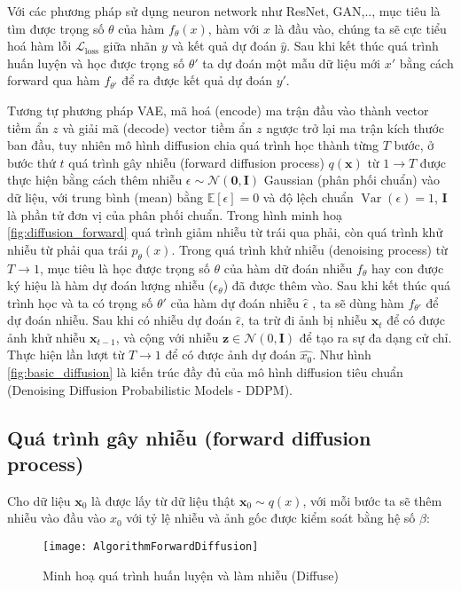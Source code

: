 Với các phương pháp sử dụng neuron network như ResNet, GAN,.., mục tiêu là tìm được trọng số $\theta$ của hàm $f_{\theta}(x)$, hàm với $x$ là đầu vào, chúng ta sẽ cực tiểu hoá hàm lỗi $\mathcal{L}_\text{loss}$ giữa nhãn $y$ và kết quả dự đoán $\hat{y}$. Sau khi kết thúc quá trình huấn luyện và học được trọng số $\theta'$ ta dự đoán một mẫu dữ liệu mới $x'$ bằng cách forward qua hàm $f_{\theta'}$ để ra được kết quả dự đoán $y'$.



Tương tự phương pháp VAE, mã hoá (encode) ma trận đầu vào thành vector tiềm ẩn $z$ và giải mã (decode) vector tiềm ẩn $z$ ngược trở lại ma trận kích thước ban đầu, tuy nhiên mô hình diffusion chia quá trình học thành từng $T$ bước, ở bước thứ $t$ quá trình gây nhiễu (forward diffusion process) $q(\mathbf{x})$ từ $1 \to T$ được thực hiện bằng cách thêm nhiễu $\epsilon \sim \mathcal{N} (\mathbf{0}, \mathbf{I})$ Gaussian (phân phối chuẩn) vào dữ liệu, với trung bình  (mean) bằng $\mathbb{E}[\epsilon]=0$ và độ lệch chuẩn $\operatorname{Var}(\epsilon)=1$, $\mathbf{I}$ là phần tử đơn vị của phân phối chuẩn. Trong hình minh hoạ \ref{fig:diffusion_forward} quá trình giảm nhiễu từ trái qua phải, còn quá trình khử nhiễu từ phải qua trái $p_\theta(x)$. Trong quá trình khử nhiễu (denoising process) từ $T \to 1$, mục tiêu là học được trọng số $\theta$ của hàm dữ đoán nhiễu $f_{\theta}$ hay con được ký hiệu là hàm dự đoán lượng nhiễu ($\epsilon_\theta$) đã được thêm vào. Sau khi kết thúc quá trình học và ta có trọng số $\theta'$ của hàm dự đoán nhiễu $\hat{\epsilon}$ , ta sẽ dùng hàm $f_{\theta'}$ để dự đoán nhiễu. Sau khi có nhiễu dự đoán $\hat{\epsilon}$, ta trừ đi ảnh bị nhiễu $\mathbf{x}_{t}$ để có được ảnh khử nhiễu $\mathbf{x}_{t-1}$, và cộng với nhiễu $ \mathbf{z} \in \mathcal{N}(0, \mathbf{I})$ để tạo ra sự đa dạng cử chỉ. Thực hiện lần lượt từ $T \to 1$ để có được ảnh dự đoán $\hat{x_0}$. Như hình \ref{fig:basic_diffusion} là kiến trúc đầy đủ của mô hình diffusion tiêu chuẩn (Denoising Diffusion Probabilistic Models - DDPM).

\subsection{Quá trình gây nhiễu (forward diffusion process)}

Cho dữ liệu $\mathbf{x}_{0}$ là được lấy từ dữ liệu thật $\mathbf{x}_{0} \sim q(x)$, với mỗi bước ta sẽ thêm nhiễu vào đầu vào $x_{0}$ với tỷ lệ nhiễu và ảnh gốc được kiểm soát bằng hệ số $\beta$:
\vspace{-20pt}
\setcounter{figure}{5}
\begin{figure*}
	\centering
	\texttt{[image: AlgorithmForwardDiffusion]}
	\vspace{-5pt}
	\caption{Minh hoạ quá trình huấn luyện và làm nhiễu (Diffuse)}
	\label{fig:AlgorithmForwardDiffusion}
	\vspace{-10pt}
\end{figure*}


